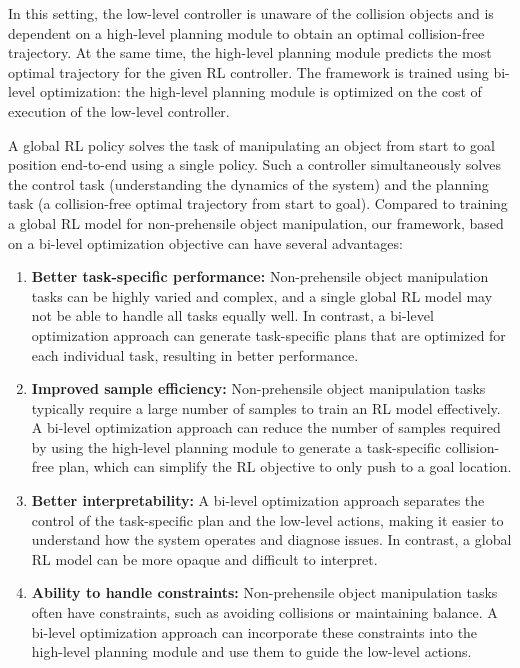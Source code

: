 In this setting, the low-level controller is unaware of the collision objects and is dependent on a high-level planning module to obtain an optimal collision-free trajectory. At the same time, the high-level planning module predicts the most optimal trajectory for the given RL controller. The framework is trained using bi-level optimization: the high-level planning module is optimized on the cost of execution of the low-level controller. 

A global RL policy solves the task of manipulating an object from start to goal position end-to-end using a single policy. Such a controller simultaneously solves the control task (understanding the dynamics of the system) and the planning task (a collision-free optimal trajectory from start to goal). 
Compared to training a global RL model for non-prehensile object manipulation, our framework, based on a bi-level optimization objective can have several advantages: 

\begin{enumerate}
    \item \textbf{Better task-specific performance:} Non-prehensile object manipulation tasks can be highly varied and complex, and a single global RL model may not be able to handle all tasks equally well. In contrast, a bi-level optimization approach can generate task-specific plans that are optimized for each individual task, resulting in better performance. 
    \item \textbf{Improved sample efficiency:} Non-prehensile object manipulation tasks typically require a large number of samples to train an RL model effectively. A bi-level optimization approach can reduce the number of samples required by using the high-level planning module to generate a task-specific collision-free plan, which can simplify the RL objective to only push to a goal location. 
    \item \textbf{Better interpretability:} A bi-level optimization approach separates the control of the task-specific plan and the low-level actions, making it easier to understand how the system operates and diagnose issues. In contrast, a global RL model can be more opaque and difficult to interpret. 
    \item \textbf{Ability to handle constraints:} Non-prehensile object manipulation tasks often have constraints, such as avoiding collisions or maintaining balance. A bi-level optimization approach can incorporate these constraints into the high-level planning module and use them to guide the low-level actions. 
\end{enumerate}

